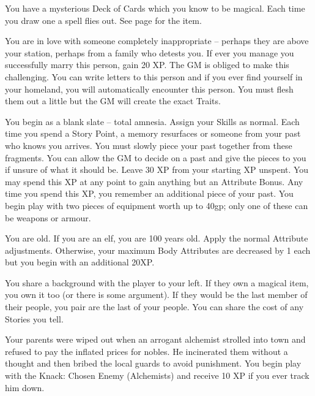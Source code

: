 \begin{multicols}{2}
\begin{list}{\addtocounter{list}{1}\textbf{:}}{\raggedleft}
  \item
  You have a mysterious Deck of Cards which you know to be magical.
  Each time you draw one a spell flies out.
  See page \pageref{deckofmanythings} for the item.

  \item
  You are in love with someone completely inappropriate -- perhaps they are above your station, perhaps from a family who detests you.
  If ever you manage you successfully marry this person, gain 20 XP.
  The GM is obliged to make this challenging.
  You can write letters to this person and if you ever find yourself in your homeland, you will automatically encounter this person.
  You must flesh them out a little but the GM will create the exact Traits.

  \item
  You begin as a blank slate -- total amnesia.
  Assign your Skills as normal.
  Each time you spend a Story Point, a memory resurfaces or someone from your past who knows you arrives.
  You must slowly piece your past together from these fragments.
  You can allow the GM to decide on a past and give the pieces to you if unsure of what it should be.
  Leave 30 XP from your starting XP unspent.
  You may spend this XP at any point to gain anything but an Attribute Bonus.
  Any time you spend this XP, you remember an additional piece of your past.
  You begin play with two pieces of equipment worth up to 40gp; only one of these can be weapons or armour.

  \item
  You are old.
  If you are an elf, you are 100 years old.
  Apply the normal Attribute adjustments.
  Otherwise, your maximum Body Attributes are decreased by 1 each but you begin with an additional 20XP.

  \item
  You share a background with the player to your left.
  If they own a magical item, you own it too (or there is some argument).
  If they would be the last member of their people, you pair are the last of your people.
  You can share the cost of any Stories you tell.

  \item
  Your parents were wiped out when an arrogant alchemist strolled into town and refused to pay the inflated prices for nobles.
  He incinerated them without a thought and then bribed the local guards to avoid punishment.
  You begin play with the Knack: Chosen Enemy (Alchemists) and receive 10 XP if you ever track him down.


\end{list}
\end{multicols}
